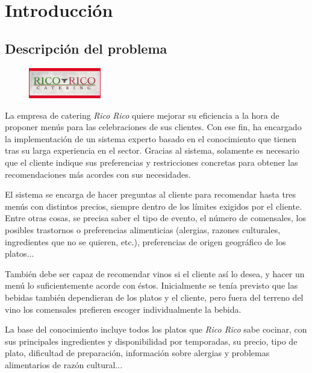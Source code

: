 % 

\section{Introducción}
\subsection{Descripción del problema}

\begin{figure}
  \vspace{-20pt}
  \begin{center}
    \includegraphics[width=0.28\textwidth]{figures/ricorico}
  \end{center}
  \vspace{-20pt}
\end{figure}

La empresa de catering \emph{Rico Rico} quiere mejorar su eficiencia a la hora
de proponer menús para las celebraciones de sus clientes. Con ese fin, ha
encargado la implementación de un sistema experto basado en el conocimiento que
tienen tras su larga experiencia en el sector. Gracias al sistema, solamente es
necesario que el cliente indique sus preferencias y restricciones concretas
para obtener las recomendaciones más acordes con sus necesidades.

El sistema se encarga de hacer preguntas al cliente para recomendar hasta tres
menús con distintos precios, siempre dentro de los límites exigidos por el
cliente. Entre otras cosas, se precisa saber el tipo de evento, el número de
comensales, los posibles trastornos o preferencias alimenticias (alergias,
razones culturales, ingredientes que no se quieren, etc.), preferencias de
origen geográfico de los platos...

También debe ser capaz de recomendar vinos si el cliente así lo desea, y hacer
un menú lo suficientemente acorde con éstos. Inicialmente se tenía previsto que
las bebidas también dependieran de los platos y el cliente, pero fuera del
terreno del vino los comensales prefieren escoger individualmente la bebida.

La base del conocimiento incluye todos los platos que \emph{Rico Rico} sabe
cocinar, con sus principales ingredientes y disponibilidad por temporadas, su
precio, tipo de plato, dificultad de preparación, información sobre alergias y
problemas alimentarios de razón cultural...


